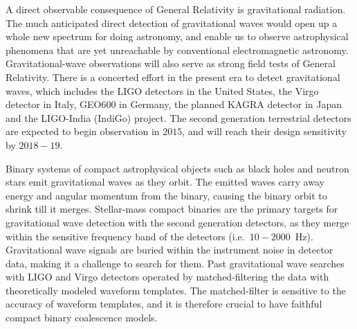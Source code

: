 
A direct observable consequence of General Relativity is gravitational
radiation. The much anticipated direct detection of gravitational waves 
would open up a whole new spectrum for doing astronomy, and enable us to 
observe astrophysical phenomena that are yet unreachable by conventional 
electromagnetic astronomy. 
Gravitational-wave observations will also serve as strong field tests of
General Relativity. There is a concerted effort in the present era to 
detect gravitational waves, which includes the LIGO detectors in the United
States, the Virgo detector in Italy, GEO600 in Germany, the planned KAGRA
detector in Japan and the LIGO-India (IndiGo) project. The second generation
terrestrial detectors are expected to begin observation in $2015$, and will
reach their design sensitivity by $2018-19$.

Binary systems of compact astrophysical objects such as black holes and 
neutron stars emit gravitational waves as they orbit. The emitted 
waves carry away energy and angular momentum from the binary, causing the binary
orbit to shrink till it merges. Stellar-mass compact binaries are the primary
targets for gravitational wave detection with the second generation detectors, 
as they merge within the sensitive frequency band of the detectors (i.e.~$10-2000$~Hz).
Gravitational wave signals are buried within the instrument noise in detector
data, making it a challenge to search for them. 
Past gravitational wave searches with LIGO and Virgo detectors operated by 
matched-filtering the data with theoretically modeled waveform templates. 
The matched-filter is sensitive to the accuracy of waveform templates, and it 
is therefore crucial to have faithful compact binary coalescence models.


